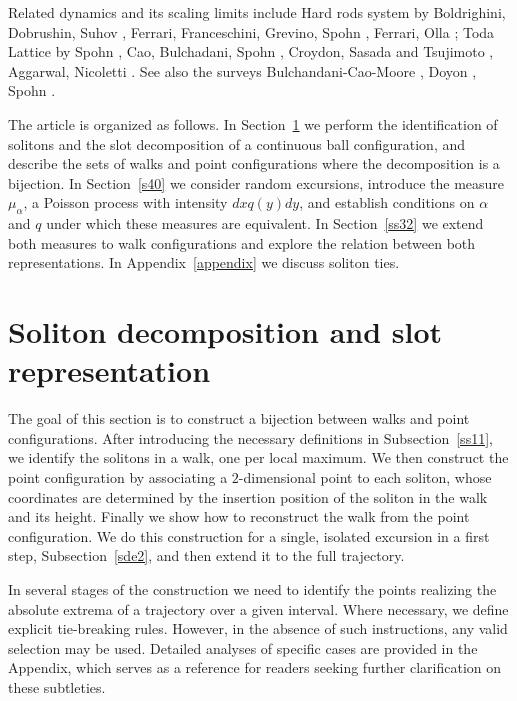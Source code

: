 \documentclass[12pt]{article}
\numberwithin{equation}{section}
\begin{document}
Related dynamics and its scaling limits include Hard rods system by Boldrighini, Dobrushin, Suhov \cite{bds,BS}, Ferrari, Franceschini, Grevino, Spohn \cite{ffgs}, Ferrari, Olla \cite{fo2022}; Toda Lattice by Spohn \cite{zbMATH07852571}, Cao, Bulchadani, Spohn \cite{cbs}, Croydon, Sasada and Tsujimoto \cite{zbMATH07653279,zbMATH07620722}, Aggarwal, Nicoletti \cite{arXiv:2604.14346}.   See also the surveys Bulchandani-Cao-Moore \cite{bulchandani-cao-moore}, Doyon \cite{Doyon_2019}, Spohn \cite{Spohn_2019,spohn2023}.

The article is organized as follows.
In Section~\ref{s1} we perform the identification of solitons and the slot decomposition of a continuous ball configuration, and describe the sets of walks and point configurations where the decomposition is a bijection. In Section~\ref{s40} we consider random excursions, introduce the measure $\mu_\alpha$, a Poisson process with intensity $dxq(y)dy$, and establish conditions on $\alpha$ and $q$ under which these measures are equivalent. In Section~\ref{ss32} we extend both measures to walk configurations and explore the relation between both representations. In Appendix~\ref{appendix} we discuss soliton ties.



\section{Soliton decomposition and slot representation}
\label{s1}

The goal of this section is to construct a bijection between walks and point configurations.
After introducing the necessary definitions in Subsection~\ref{ss11}, we 
identify the solitons in a walk, one per local maximum.
We then construct the point configuration by associating  a $2$-dimensional point to each soliton, whose coordinates are determined by the insertion position of the soliton in the walk and its height.
Finally we show how to reconstruct the walk from the point configuration. We do this construction for a single, isolated excursion in a first step, Subsection~\ref{sde2}, and then extend it to the full trajectory. 

In several stages of the construction we need to identify the points realizing the absolute extrema of a trajectory over a given interval. Where necessary, we define explicit tie-breaking rules. However, in the absence of such instructions, any valid selection may be used. Detailed analyses of specific cases are provided in the Appendix, which serves as a reference for readers seeking further clarification on these subtleties.
\end{document}

